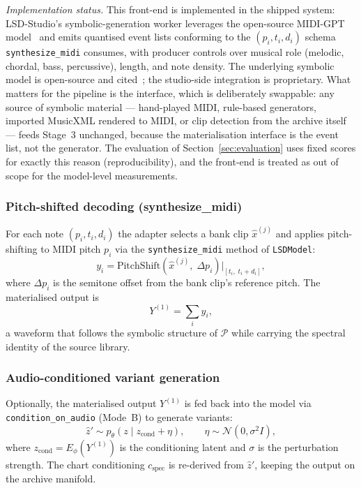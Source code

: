 \documentclass[12pt,a4paper]{article}
\begin{document}
\emph{Implementation status.} This front-end is implemented in the
shipped system: LSD-Studio's symbolic-generation worker leverages the
open-source MIDI-GPT model~\cite{midigpt2025} and emits quantised event
lists conforming to the
$(p_i, t_i, d_i)$ schema \texttt{synthesize\_midi} consumes, with
producer controls over musical role (melodic, chordal, bass,
percussive), length, and note density. The underlying symbolic model is
open-source and cited~\cite{midigpt2025}; the studio-side integration is
proprietary. What
matters for the pipeline is the interface, which is deliberately
swappable: any source of symbolic material — hand-played MIDI,
rule-based generators, imported MusicXML rendered to MIDI, or clip
detection from the archive itself — feeds Stage~3 unchanged, because
the materialisation interface is the event list, not the generator.
The evaluation of Section~\ref{sec:evaluation} uses fixed scores for
exactly this reason (reproducibility), and the front-end is treated as
out of scope for the model-level measurements.

\subsubsection{Pitch-shifted decoding (synthesize\_midi)}

For each note $(p_i, t_i, d_i)$ the adapter selects a bank clip
$\hat{x}^{(j)}$ and applies pitch-shifting to MIDI pitch $p_i$ via the
\texttt{synthesize\_midi} method of \texttt{LSDModel}:
\begin{equation}
  y_i = \mathrm{PitchShift}\!\left(\hat{x}^{(j)},\;
    \Delta p_i\right)\bigg|_{[t_i,\; t_i + d_i]},
  \label{eq:pitchshift}
\end{equation}
where $\Delta p_i$ is the semitone offset from the bank clip's reference
pitch. The materialised output is
\begin{equation}
  Y^{(1)} = \sum_i y_i,
  \label{eq:materialise}
\end{equation}
a waveform that follows the symbolic structure of $\mathcal{P}$ while
carrying the spectral identity of the source library.

\subsubsection{Audio-conditioned variant generation}

Optionally, the materialised output $Y^{(1)}$ is fed back into the model
via \texttt{condition\_on\_audio} (Mode~B) to generate variants:
\begin{equation}
  \hat{z}' \sim p_\theta(z \mid z_{\mathrm{cond}} + \eta),
  \qquad \eta \sim \mathcal{N}(0, \sigma^2 I),
  \label{eq:conditioned_sampling}
\end{equation}
where $z_{\mathrm{cond}} = E_\phi(Y^{(1)})$ is the conditioning latent
and $\sigma$ is the perturbation strength. The chart conditioning
$c_{\mathrm{spec}}$ is re-derived from $\hat{z}'$, keeping the output on
the archive manifold.
\end{document}
